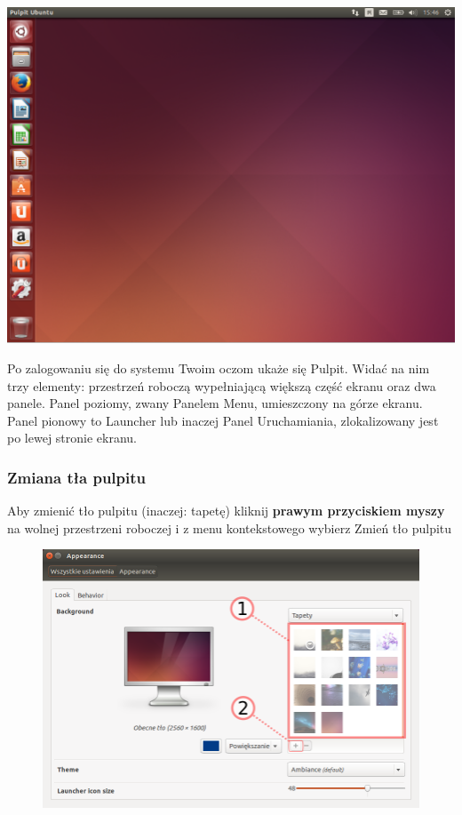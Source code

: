 \begin{center}
	\includegraphics[width=\linewidth]{images/unity_desktop.png}
\end{center}

Po zalogowaniu się do systemu Twoim oczom ukaże się Pulpit. Widać na nim trzy elementy: przestrzeń roboczą wypełniającą większą część ekranu oraz dwa panele. Panel poziomy, zwany \textcolor{ubuntu_orange}{Panelem Menu}, umieszczony na górze ekranu. Panel pionowy to \textcolor{ubuntu_orange}{Launcher} lub inaczej Panel Uruchamiania, zlokalizowany jest po lewej stronie ekranu.

\subsubsection{Zmiana tła pulpitu}
Aby zmienić tło pulpitu (inaczej: tapetę) kliknij \textbf{prawym przyciskiem myszy} na wolnej przestrzeni roboczej i z menu kontekstowego wybierz \textcolor{ubuntu_orange}{Zmień tło pulpitu}

\begin{figure}
                \includegraphics[width=\linewidth]{images/unity_zmiana_tapety.png}
\end{figure}

